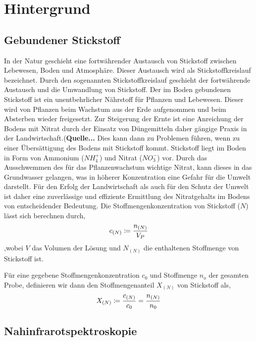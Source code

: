 \section{Hintergrund}
\label{sec:Hintergrund}
	
	\subsection{Gebundener Stickstoff}
	\label{ssec:Gebundener Stickstoff}
	
	In der Natur geschieht eine fortwährender Austausch von Stickstoff zwischen Lebewesen, Boden und Atmosphäre. Dieser Austausch wird als Stickstoffkreislauf bezeichnet.
	Durch den sogenannten Stickstoffkreislauf geschieht der fortwährende  Austausch und die Umwandlung von Stickstoff.
	Der im Boden gebundenen Stickstoff ist ein unentbehrlicher Nährstoff für Pflanzen und Lebewesen.
	Dieser wird von Pflanzen beim Wachstum aus der Erde aufgenommen und beim Absterben wieder freigesetzt.
    Zur Steigerung der Ernte ist eine Anreichung der Bodens mit Nitrat durch der Einsatz von Düngemitteln daher gängige Praxis in der Landwirtschaft.(\textbf{Quelle...}
    Dies kann dann zu Problemen führen, wenn zu einer Übersättigung des Bodens mit Stickstoff kommt.
    Stickstoff liegt im Boden in Form von Ammonium ($NH_4^+$) und Nitrat ($NO_3^-$) vor.
    Durch das Ausschwemmen des für das Pflanzenwachstum wichtige Nitrat, kann dieses in das Grundwasser gelangen, was in höherer Konzentration eine Gefahr für die Umwelt darstellt.
    Für den Erfolg der Landwirtschaft als auch für den Schutz der Umwelt ist daher eine zuverlässige und effiziente Ermittlung des Nitratgehalts im Bodens von entscheidender Bedeutung.
    Die Stoffmengenkonzentration von Stickstoff ($N$) lässt sich berechnen durch,
    	\[
			c_{(N)} \coloneqq \frac{n_{(N)}}{V_P}
		\]
		,wobei $V$ das Volumen der Lösung und $N_{(N)}$ die enthaltenen Stoffmenge von Stickstoff ist.
		
    Für eine gegebene Stoffmengenkonzentration $c_0$ und Stoffmenge $n_o$ der gesamten Probe, definieren wir dann den Stoffmengenanteil $X_{(N)}$ von Stickstoff als,
        \[
			X_{(N)} \coloneqq \frac{c_{(N)}}{c_0} = \frac{n_{(N)}}{n_0}
		\]
   

	\subsection{Nahinfrarotspektroskopie}
	\label{ssec:nirs}
	
